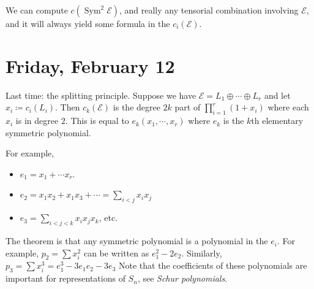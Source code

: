 \begin{example}[?]

We can compute \(c(\operatorname{Sym}^2 \mathcal{E})\), and really any
tensorial combination involving \(\mathcal{E}\), and it will always
yield some formula in the \(c_i( \mathcal{E} )\).

\end{example}

\hypertarget{friday-february-12}{%
\section{Friday, February 12}\label{friday-february-12}}

\begin{remark}

Last time: the splitting principle. Suppose we have
\(\mathcal{E} = L_1 \oplus \cdots \oplus L_r\) and let
\(x_i \coloneqq c_i(L_i)\). Then \(c_k(\mathcal{E})\) is the degree
\(2k\) part of \(\prod_{i=1}^r (1 + x_i )\) where each \(x_i\) is in
degree \(2\). This is equal to \(e_k(x_1, \cdots, x_r)\) where \(e_k\)
is the \(k\)th elementary symmetric polynomial.

\end{remark}

\begin{example}[?]

For example,

\begin{itemize}
\item
  \(e_1 = x_1 + \cdots x_r\).
\item
  \(e_2 = x_1 x_2 + x_1 x_3 + \cdots = \sum_{i < j} x_i x_j\)
\item
  \(e_3 = \sum_{i<j<k} x_i x_j x_k\), etc.
\end{itemize}

\end{example}

\begin{remark}

The theorem is that any symmetric polynomial is a polynomial in the
\(e_i\). For example, \(p_2 = \sum x_i^2\) can be written as
\(e_1^2 - 2e_2\). Similarly,
\(p_3 = \sum x_i^3 = e_1^3 - 3e_1 e_2 -3e_3\) Note that the coefficients
of these polynomials are important for representations of \(S_n\), see
\emph{Schur polynomials}.

\end{remark}

